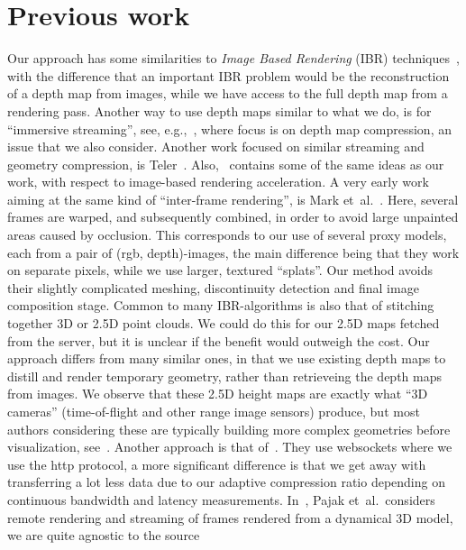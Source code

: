\documentclass[10pt,conference,compsocconf]{IEEEtran}
\newcommand{\eg}{{e.g.}}
\newcommand{\etal}{{et~al.}}
\begin{document}
\section{Previous work}
\label{sec:prevWork}

Our approach has some similarities to {\em Image Based Rendering} (IBR)
techniques~\cite{journalsritaOliveira02}, with the difference that an
important IBR problem would be the reconstruction of a depth map from images,
while we have access to the full depth map from a rendering pass.  Another way
to use depth maps similar to what we do, is for ``immersive streaming'', see,
\eg,~\cite{ibr}, where focus is on depth map compression, an issue that we also
consider. Another work focused on similar streaming and geometry compression,
is Teler~\cite{teler}. Also,~\cite{220764} contains some of the same ideas as our
work, with respect to image-based rendering acceleration.
%
A very early work aiming at the same kind of ``inter-frame rendering'', is
Mark \etal~\cite{Mark:1997:PW:253284.253292}. Here, several frames are warped,
and subsequently combined, in order to avoid large unpainted areas caused by
occlusion. This corresponds to our use of several proxy models, each from a pair
of (rgb, depth)-images, the main difference being that they work on separate
pixels, while we use larger, textured ``splats''. Our method avoids their
slightly complicated meshing, discontinuity detection and final image
composition stage.
%
Common to many IBR-algorithms is also that of stitching together 3D or 2.5D
point clouds. We could do this for our 2.5D maps fetched from the server, but it
is unclear if the benefit would outweigh the cost.
%
Our approach differs from many similar ones, in that we use existing depth maps 
to distill and render temporary geometry, rather than retrieveing the depth maps from images.
%
We observe that these 2.5D height maps are exactly what ``3D cameras''
(time-of-flight and other range image sensors) produce, but most authors
considering these are typically building more complex geometries before
visualization, see~\cite{IMM2009-05801}.
%
Another approach is that of~\cite{altenhofen16rixels}. They use websockets
where we use the http protocol, a more significant difference is that we get
away with transferring a lot less data due to our adaptive compression ratio
depending on continuous bandwidth and latency measurements.
%
In~\cite{CGF:CGF1871}, Pajak \etal~considers remote rendering and streaming of
frames rendered from a dynamical 3D model, we are quite agnostic to the source
\end{document}
